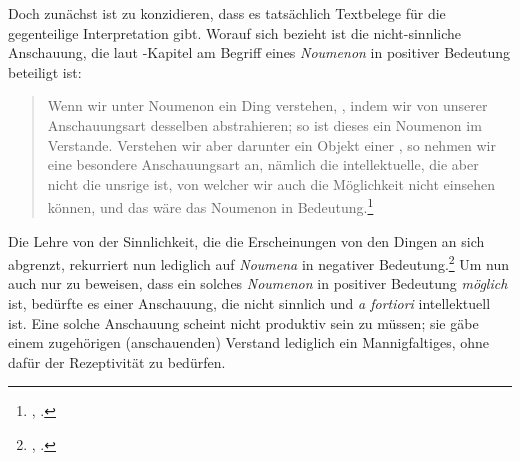 Doch zunächst ist zu konzidieren, dass es tatsächlich Textbelege für die
gegenteilige Interpretation gibt. Worauf
 sich bezieht ist die
nicht-sinnliche Anschauung, die laut -Kapitel am
Begriff eines \emph{Noumenon} in positiver Bedeutung beteiligt ist:
\begin{quote}
Wenn wir unter Noumenon ein Ding verstehen, , indem wir von unserer Anschauungsart
desselben abstrahieren; so ist dieses ein Noumenon im  Verstande.
Verstehen wir aber darunter ein Objekt einer ,
so nehmen wir eine besondere Anschauungsart an, nämlich die intellektuelle, die
aber nicht die unsrige ist, von welcher wir auch die Möglichkeit nicht einsehen
können, und das wäre das Noumenon in 
Bedeutung.\footnote{\cite[][B 307]{Kant:KritikderreinenVernunft2003},
\cite[][III: 209.32--210.2]{Kant:GesammelteWerke1900ff.}.}
\end{quote}
Die Lehre von der Sinnlichkeit, die die Erscheinungen von den Dingen an sich
abgrenzt, rekurriert nun lediglich auf \emph{Noumena} in negativer
Bedeutung.\footnote{\cite[Vgl.][B 307--309]{Kant:KritikderreinenVernunft2003},
\cite[][III: 210.3--34]{Kant:GesammelteWerke1900ff.}.} Um nun auch nur zu
beweisen, dass ein solches \emph{Noumenon} in positiver Bedeutung \emph{möglich} ist,
bedürfte es einer Anschauung, die nicht sinnlich und \emph{a fortiori}
intellektuell ist. Eine solche Anschauung scheint nicht produktiv sein zu
müssen; sie gäbe einem zugehörigen (anschauenden) Verstand lediglich ein
Mannigfaltiges, ohne dafür der Rezeptivität zu bedürfen.


